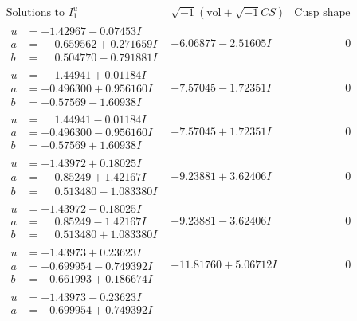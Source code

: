 \documentclass[1p]{elsarticle_modified}
\theoremstyle{definition}
\newcommand{\I}{\sqrt{-1}}
\begin{document}
$$\begin{array}{c|c|c}
\text{Solutions to }I^u_{1}& \I (\text{vol} + \sqrt{-1}CS) & \text{Cusp shape}\\
 \hline 
\begin{aligned}
u &= -1.42967 - 0.07453 I \\
a &= \phantom{-}0.659562 + 0.271659 I \\
b &= \phantom{-}0.504770 - 0.791881 I\end{aligned}
 & -6.06877 - 2.51605 I & \phantom{-0.000000 } 0 \\ \hline\begin{aligned}
u &= \phantom{-}1.44941 + 0.01184 I \\
a &= -0.496300 + 0.956160 I \\
b &= -0.57569 - 1.60938 I\end{aligned}
 & -7.57045 - 1.72351 I & \phantom{-0.000000 } 0 \\ \hline\begin{aligned}
u &= \phantom{-}1.44941 - 0.01184 I \\
a &= -0.496300 - 0.956160 I \\
b &= -0.57569 + 1.60938 I\end{aligned}
 & -7.57045 + 1.72351 I & \phantom{-0.000000 } 0 \\ \hline\begin{aligned}
u &= -1.43972 + 0.18025 I \\
a &= \phantom{-}0.85249 + 1.42167 I \\
b &= \phantom{-}0.513480 - 1.083380 I\end{aligned}
 & -9.23881 + 3.62406 I & \phantom{-0.000000 } 0 \\ \hline\begin{aligned}
u &= -1.43972 - 0.18025 I \\
a &= \phantom{-}0.85249 - 1.42167 I \\
b &= \phantom{-}0.513480 + 1.083380 I\end{aligned}
 & -9.23881 - 3.62406 I & \phantom{-0.000000 } 0 \\ \hline\begin{aligned}
u &= -1.43973 + 0.23623 I \\
a &= -0.699954 - 0.749392 I \\
b &= -0.661993 + 0.186674 I\end{aligned}
 & -11.81760 + 5.06712 I & \phantom{-0.000000 } 0 \\ \hline\begin{aligned}
u &= -1.43973 - 0.23623 I \\
a &= -0.699954 + 0.749392 I \\

\end{aligned}
\end{array}$$
\end{document}
